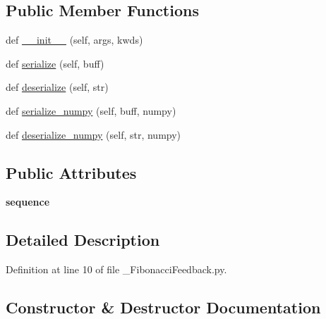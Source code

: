 \subsection*{Public Member Functions}
\begin{DoxyCompactItemize}
\item 
def \hyperlink{classlearning__actionlib_1_1msg_1_1__FibonacciFeedback_1_1FibonacciFeedback_a6f4d9037188355b7f6a8d23c99fdd54a}{\+\_\+\+\_\+init\+\_\+\+\_\+} (self, args, kwds)
\item 
def \hyperlink{classlearning__actionlib_1_1msg_1_1__FibonacciFeedback_1_1FibonacciFeedback_a486453143057a82c3249196facc5220c}{serialize} (self, buff)
\item 
def \hyperlink{classlearning__actionlib_1_1msg_1_1__FibonacciFeedback_1_1FibonacciFeedback_a09711fb93a20ed8d656c5b1353024ff1}{deserialize} (self, str)
\item 
def \hyperlink{classlearning__actionlib_1_1msg_1_1__FibonacciFeedback_1_1FibonacciFeedback_a1bcb04e527c0b72c0e22efde76badf7d}{serialize\+\_\+numpy} (self, buff, numpy)
\item 
def \hyperlink{classlearning__actionlib_1_1msg_1_1__FibonacciFeedback_1_1FibonacciFeedback_a264aebb89e72705d615b2b393b233090}{deserialize\+\_\+numpy} (self, str, numpy)
\end{DoxyCompactItemize}
\subsection*{Public Attributes}
\begin{DoxyCompactItemize}
\item 
\mbox{\label{classlearning__actionlib_1_1msg_1_1__FibonacciFeedback_1_1FibonacciFeedback_ac930b488b27f331c3bb427fb8bb0d032}} 
{\bfseries sequence}
\end{DoxyCompactItemize}


\subsection{Detailed Description}


Definition at line 10 of file \+\_\+\+Fibonacci\+Feedback.\+py.



\subsection{Constructor \& Destructor Documentation}
\mbox{\label{classlearning__actionlib_1_1msg_1_1__FibonacciFeedback_1_1FibonacciFeedback_a6f4d9037188355b7f6a8d23c99fdd54a}} 
